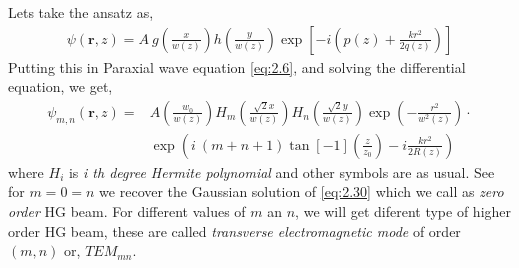 \documentclass[11pt,a4paper]{article}
\numberwithin{equation}{section}
\begin{document}
Lets take the ansatz as,
\begin{align}
	\psi(\boldsymbol{r},z)= A \: g\left(\frac{x}{w(z)}\right) h\left(\frac{y}{w(z)}\right) \exp\left[-i\left(p(z) + \frac{kr^2}{2q(z)}\right)\right]
\end{align}
Putting this in Paraxial wave equation \ref{eq:2.6}, and solving the differential equation, \cite{milonni} we get,
\begin{align}
	\psi_{m,n}(\boldsymbol{r},z)=& A \left(\frac{w_0}{w(z)}\right) H_m\left(\frac{\sqrt{2} x}{w(z)}\right) H_n\left(\frac{\sqrt{2} y}{w(z)}\right)\exp( -\frac{r^2}{w^2(z)}) \cdot\nonumber\\ 
	&\exp( i\:(m+n+1)\tan[-1](\frac{z}{z_0}) -i\frac{kr^2}{2R(z)}) \label{eq:2.53}
\end{align}
where $H_i$ is \textit{i th degree Hermite polynomial} and other symbols are as usual.
See for $m=0=n$ we recover the Gaussian solution of \ref{eq:2.30} which we call as \textit{zero order} HG beam. For different values of $m$ an $n$, we will get diferent type of higher order HG beam, these are called \textit{transverse electromagnetic mode} of order $(m,n)$ or, $TEM_{mn}$. 
\end{document}
